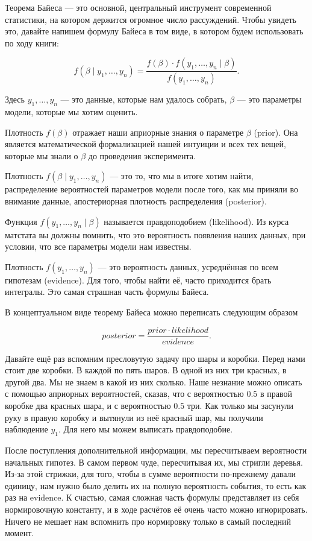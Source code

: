 \documentclass[12pt, a4paper, oneside]{extreport}
\def \b{\beta}
\theoremstyle{plain}              %
\theoremstyle{definition}         %
\begin{document}
Теорема Байеса --- это основной, центральный инструмент современной статистики, на котором держится огромное число рассуждений. Чтобы увидеть это, давайте напишем формулу Байеса в том виде, в котором будем использовать по ходу книги: 

\[ 
f(\b \mid y_1, \ldots, y_n) = \frac{f(\b) \cdot f(y_1, \ldots, y_n \mid \b)}{f(y_1, \ldots, y_n)}.
\]

Здесь $y_1, \ldots, y_n$ --- это данные, которые нам удалось собрать, $\b$ --- это параметры модели, которые мы хотим оценить.   

Плотность $f(\b)$ отражает наши априорные знания о параметре $\b$ (prior).  Она является математической формализацией нашей интуиции и всех тех вещей, которые мы знали о $\b$ до проведения эксперимента. 

Плотность $f(\b \mid y_1, \ldots, y_n) $ --- это то, что мы в итоге хотим найти, распределение вероятностей параметров модели после того, как мы приняли во внимание данные, апостериорная плотность распределения (posterior).  

 Функция $f(y_1, \ldots, y_n \mid \b )$ называется правдоподобием (likelihood). Из курса матстата вы должны помнить, что это вероятность появления наших данных, при условии, что все параметры модели нам известны. 
 
 Плотность $f(y_1, \ldots, y_n)$ --- это вероятность данных, усреднённая по всем гипотезам (evidence).  Для того, чтобы найти её, часто приходится брать интегралы. Это самая страшная часть формулы Байеса. 

В концептуальном виде теорему Байеса можно переписать следующим образом

\[ 
posterior = \frac{prior \cdot likelihood}{evidence}.
\]

Давайте ещё раз вспомним пресловутую задачу про шары и коробки.  Перед нами стоит две коробки. В каждой по пять шаров. В одной из них три красных, в другой два. Мы не знаем в какой из них сколько. Наше незнание можно описать с помощью априорных вероятностей, сказав, что с вероятностью $0.5$ в правой коробке два красных шара, и с вероятностью $0.5$ три.  Как только мы засунули руку в правую коробку и вытянули из неё красный шар, мы получили наблюдение $y_1$. Для него мы можем выписать правдоподобие. 

После поступления дополнительной информации, мы пересчитываем вероятности начальных гипотез. В самом первом чуде, пересчитывая их, мы стригли деревья. Из-за этой стрижки, для того, чтобы в сумме вероятности по-прежнему давали единицу, нам нужно было делить их на полную вероятность события, то есть как раз на evidence. К счастью, самая сложная часть формулы представляет из себя нормировочную константу, и в ходе расчётов её очень часто можно игнорировать. Ничего не мешает нам вспомнить про нормировку только в самый последний момент.
\end{document}
